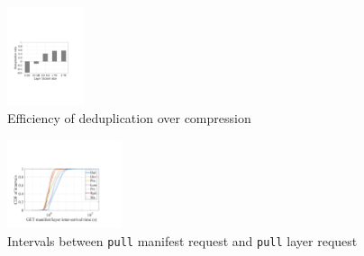 \begin{figure}[t]
\centering
			\includegraphics[width=0.2\textwidth]{graphs/dedup_vs_compression.pdf}
			\caption{Efficiency of deduplication over compression}
			\label{fig:cacheefficiency}

\end{figure}
\begin{figure}[t]
	\centering
	\includegraphics[width=0.3\textwidth]{graphs/GML-intervals.pdf}
	\caption{Intervals between \texttt{pull} manifest request and \texttt{pull} layer request}
	\label{fig:intervals}
	
\end{figure}


